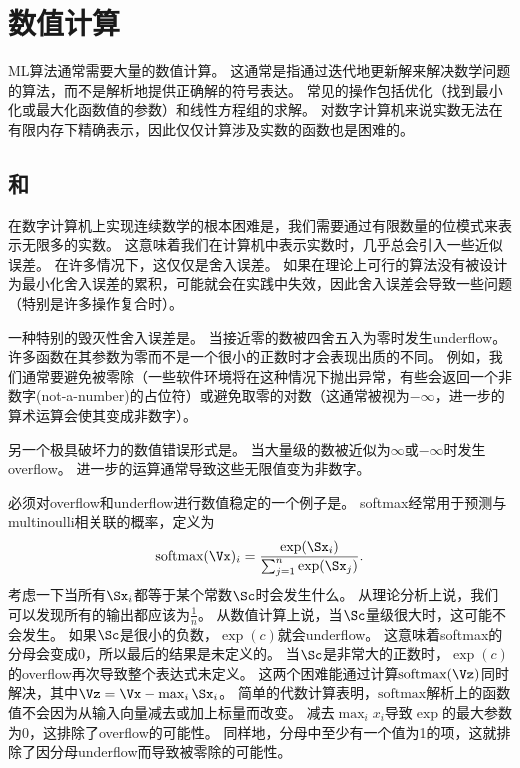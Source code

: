 \chapter{数值计算}
\label{chap:numerical_computation}

\gls{ML}算法通常需要大量的数值计算。
这通常是指通过迭代地更新解来解决数学问题的算法，而不是解析地提供正确解的符号表达。
常见的操作包括优化（找到最小化或最大化函数值的参数）和线性方程组的求解。
对数字计算机来说实数无法在有限内存下精确表示，因此仅仅计算涉及实数的函数也是困难的。

\section{和}
\label{sec:overflow_and_underflow}
在数字计算机上实现连续数学的根本困难是，我们需要通过有限数量的位模式来表示无限多的实数。
这意味着我们在计算机中表示实数时，几乎总会引入一些近似误差。
在许多情况下，这仅仅是舍入误差。
如果在理论上可行的算法没有被设计为最小化舍入误差的累积，可能就会在实践中失效，因此舍入误差会导致一些问题（特别是许多操作复合时）。

一种特别的毁灭性舍入误差是。
当接近零的数被四舍五入为零时发生\gls{underflow}。
许多函数在其参数为零而不是一个很小的正数时才会表现出质的不同。
例如，我们通常要避免被零除（一些软件环境将在这种情况下抛出异常，有些会返回一个非数字(not-a-number)的占位符）或避免取零的对数（这通常被视为$-\infty$，进一步的算术运算会使其变成非数字）。


另一个极具破坏力的数值错误形式是。
当大量级的数被近似为$\infty$或$-\infty$时发生\gls{overflow}。
进一步的运算通常导致这些无限值变为非数字。

必须对\gls{overflow}和\gls{underflow}进行数值稳定的一个例子是。
\gls{softmax}经常用于预测与\gls{multinoulli}相关联的概率，定义为
\begin{align}
 \text{softmax}(\Vx)_i = \frac{\exp(\Sx_i)}{\sum_{j=1}^n \exp(\Sx_j)} .
\end{align}
考虑一下当所有$\Sx_i$都等于某个常数$\Sc$时会发生什么。
从理论分析上说，我们可以发现所有的输出都应该为$\frac{1}{n}$。
从数值计算上说，当$\Sc$量级很大时，这可能不会发生。
如果$\Sc$是很小的负数，$\exp(c)$就会\gls{underflow}。
这意味着\gls{softmax}的分母会变成0，所以最后的结果是未定义的。
当$\Sc$是非常大的正数时，$\exp(c)$的\gls{overflow}再次导致整个表达式未定义。
这两个困难能通过计算$\text{softmax}(\Vz)$同时解决，其中$\Vz = \Vx - \max_i \Sx_i$。
简单的代数计算表明，$\text{softmax}$解析上的函数值不会因为从输入向量减去或加上标量而改变。
减去$\max_i x_i$导致$\exp$的最大参数为$0$，这排除了\gls{overflow}的可能性。
同样地，分母中至少有一个值为1的项，这就排除了因分母\gls{underflow}而导致被零除的可能性。

